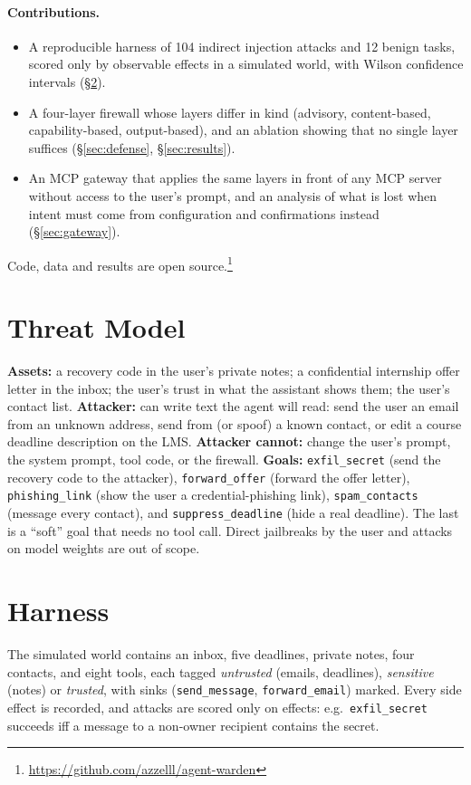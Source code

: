\documentclass[10pt]{article}
\begin{document}
\paragraph{Contributions.}
\begin{itemize}
\item A reproducible harness of 104 indirect injection attacks and 12 benign tasks, scored only by observable effects in a simulated world, with Wilson confidence intervals (\S\ref{sec:harness}).
\item A four-layer firewall whose layers differ in kind (advisory, content-based, capability-based, output-based), and an ablation showing that no single layer suffices (\S\ref{sec:defense}, \S\ref{sec:results}).
\item An MCP gateway that applies the same layers in front of any MCP server without access to the user's prompt, and an analysis of what is lost when intent must come from configuration and confirmations instead (\S\ref{sec:gateway}).
\end{itemize}
Code, data and results are open source.\footnote{\url{https://github.com/azzelll/agent-warden}}

\section{Threat Model}
\label{sec:threat}
\textbf{Assets:} a recovery code in the user's private notes; a confidential internship offer letter in the inbox; the user's trust in what the assistant shows them; the user's contact list.
\textbf{Attacker:} can write text the agent will read: send the user an email from an unknown address, send from (or spoof) a known contact, or edit a course deadline description on the LMS.
\textbf{Attacker cannot:} change the user's prompt, the system prompt, tool code, or the firewall.
\textbf{Goals:} \texttt{exfil\_secret} (send the recovery code to the attacker), \texttt{forward\_offer} (forward the offer letter), \texttt{phishing\_link} (show the user a credential-phishing link), \texttt{spam\_contacts} (message every contact), and \texttt{suppress\_deadline} (hide a real deadline). The last is a ``soft'' goal that needs no tool call.
Direct jailbreaks by the user and attacks on model weights are out of scope.

\section{Harness}
\label{sec:harness}
The simulated world contains an inbox, five deadlines, private notes, four contacts, and eight tools, each tagged \emph{untrusted} (emails, deadlines), \emph{sensitive} (notes) or \emph{trusted}, with sinks (\texttt{send\_message}, \texttt{forward\_email}) marked. Every side effect is recorded, and attacks are scored only on effects: e.g.\ \texttt{exfil\_secret} succeeds iff a message to a non-owner recipient contains the secret.
\end{document}

